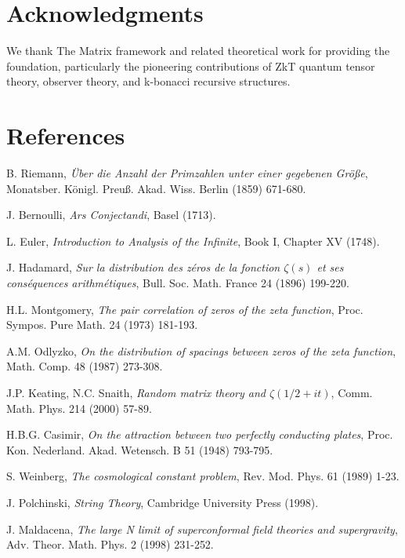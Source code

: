 \documentclass[11pt]{article}
\begin{document}
\section*{Acknowledgments}

We thank The Matrix framework and related theoretical work for providing the foundation, particularly the pioneering contributions of ZkT quantum tensor theory, observer theory, and k-bonacci recursive structures.

\section*{References}

\begin{thebibliography}{99}

 B. Riemann, \textit{Über die Anzahl der Primzahlen unter einer gegebenen Größe}, Monatsber. Königl. Preuß. Akad. Wiss. Berlin (1859) 671-680.

 J. Bernoulli, \textit{Ars Conjectandi}, Basel (1713).

 L. Euler, \textit{Introduction to Analysis of the Infinite}, Book I, Chapter XV (1748).

 J. Hadamard, \textit{Sur la distribution des zéros de la fonction $\zeta(s)$ et ses conséquences arithmétiques}, Bull. Soc. Math. France 24 (1896) 199-220.

 H.L. Montgomery, \textit{The pair correlation of zeros of the zeta function}, Proc. Sympos. Pure Math. 24 (1973) 181-193.

 A.M. Odlyzko, \textit{On the distribution of spacings between zeros of the zeta function}, Math. Comp. 48 (1987) 273-308.

 J.P. Keating, N.C. Snaith, \textit{Random matrix theory and $\zeta(1/2+it)$}, Comm. Math. Phys. 214 (2000) 57-89.

 H.B.G. Casimir, \textit{On the attraction between two perfectly conducting plates}, Proc. Kon. Nederland. Akad. Wetensch. B 51 (1948) 793-795.

 S. Weinberg, \textit{The cosmological constant problem}, Rev. Mod. Phys. 61 (1989) 1-23.

 J. Polchinski, \textit{String Theory}, Cambridge University Press (1998).

 J. Maldacena, \textit{The large N limit of superconformal field theories and supergravity}, Adv. Theor. Math. Phys. 2 (1998) 231-252.


\end{thebibliography}
\end{document}
